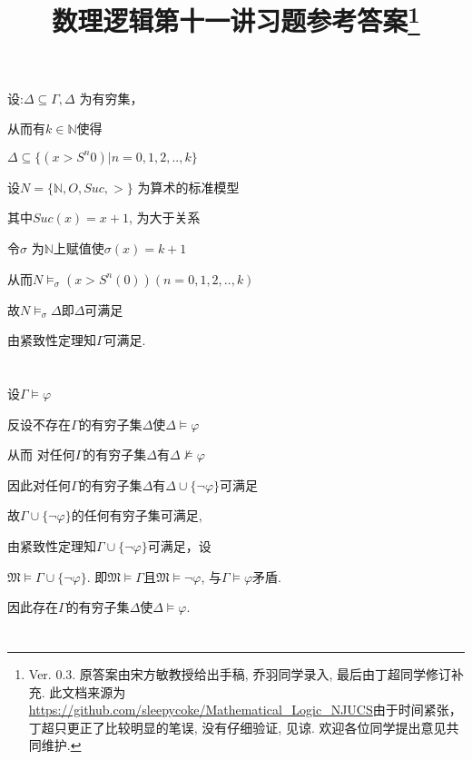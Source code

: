 \documentclass{article}
\begin{document}
\title{数理逻辑第十一讲习题参考答案\footnote{Ver. 0.3. 原答案由宋方敏教授给出手稿, 乔羽同学录入, 最后由丁超同学修订补充. 此文档来源为\url{https://github.com/sleepycoke/Mathematical_Logic_NJUCS}由于时间紧张，丁超只更正了比较明显的笔误, 没有仔细验证, 见谅. 
 欢迎各位同学提出意见共同维护. 
}}
\maketitle

\section{}

设:$\Delta \subseteq \Gamma, \Delta$ 为有穷集，

从而有$k \in \mathbb{N} $使得

$\Delta \subseteq \{ (x > S^n0) | n=0,1,2,..,k\}$

设$N = \{ \mathbb{N},O,Suc , >  \}$ 为算术的标准模型

其中$ Suc (x) =x+1 $, $ $为大于关系

令$\sigma$ 为$\mathbb{N}$上赋值使$\sigma (x) = k+1$

从而$N \vDash_\sigma (x>S^n(0))(n=0,1,2,..,k)$

故$N \vDash_\sigma \Delta$即$\Delta$可满足

由紧致性定理知$\Gamma$可满足.

\section{}


设$\Gamma \vDash \varphi$

反设不存在$\Gamma$的有穷子集$\Delta$使$\Delta \vDash \varphi$

从而 对任何$\Gamma$的有穷子集$\Delta$有$\Delta \nvDash \varphi$

因此对任何$\Gamma$的有穷子集$\Delta$有$\Delta \cup \{\neg \varphi\}$可满足

故$\Gamma \cup \{\neg \varphi\}$的任何有穷子集可满足,

由紧致性定理知$\Gamma \cup \{\neg \varphi\}$可满足，设

$\mathfrak{M} \vDash \Gamma \cup\{\neg \varphi\}$. 即$\mathfrak{M} \vDash \Gamma$且$\mathfrak{M} \vDash \neg\varphi$, 与$\Gamma \models \varphi$矛盾. 

因此存在$\Gamma$的有穷子集$\Delta$使$\Delta \models \varphi$. 

\section{}
\end{document}
